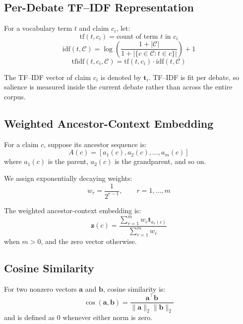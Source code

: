 \documentclass[11pt,a4paper]{article}
\begin{document}
\subsection{Per-Debate TF--IDF Representation}
For a vocabulary term \(t\) and claim \(c_i\), let:
\begin{equation}
\mathrm{tf}(t,c_i) = \text{count of term } t \text{ in } c_i
\end{equation}
\begin{equation}
\mathrm{idf}(t,\mathcal{C}) =
\log\left(\frac{1+|\mathcal{C}|}{1+|\{c \in \mathcal{C} : t \in c\}|}\right)+1
\end{equation}
\begin{equation}
\mathrm{tfidf}(t,c_i,\mathcal{C}) =
\mathrm{tf}(t,c_i)\cdot \mathrm{idf}(t,\mathcal{C})
\end{equation}

The TF--IDF vector of claim \(c_i\) is denoted by \(\mathbf{t}_i\). TF--IDF is fit per debate, so salience is measured inside the current debate rather than across the entire corpus.

\subsection{Weighted Ancestor-Context Embedding}
For a claim \(c\), suppose its ancestor sequence is:
\[
A(c) = [a_1(c), a_2(c), \dots, a_m(c)]
\]
where \(a_1(c)\) is the parent, \(a_2(c)\) is the grandparent, and so on.

We assign exponentially decaying weights:
\begin{equation}
w_r = \frac{1}{2^{r-1}}, \qquad r = 1,\dots,m
\end{equation}

The weighted ancestor-context embedding is:
\begin{equation}
\mathbf{z}(c)
=
\frac{\sum_{r=1}^{m} w_r \mathbf{t}_{a_r(c)}}{\sum_{r=1}^{m} w_r}
\end{equation}
when \(m>0\), and the zero vector otherwise.

\subsection{Cosine Similarity}
For two nonzero vectors \(\mathbf{a}\) and \(\mathbf{b}\), cosine similarity is:
\begin{equation}
\cos(\mathbf{a},\mathbf{b})
=
\frac{\mathbf{a}^{\top}\mathbf{b}}{\|\mathbf{a}\|_2 \|\mathbf{b}\|_2}
\end{equation}
and is defined as \(0\) whenever either norm is zero.
\end{document}
